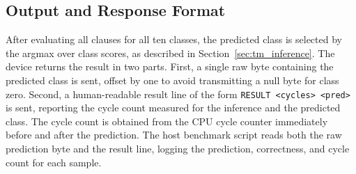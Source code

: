 \subsection{Output and Response Format}
\label{sec:output_format}

After evaluating all clauses for all ten classes, the predicted class is selected by the argmax over class scores, as described in Section~\ref{sec:tm_inference}. The device returns the result in two parts. First, a single raw byte containing the predicted class is sent, offset by one to avoid transmitting a null byte for class zero. Second, a human-readable result line of the form \texttt{RESULT <cycles> <pred>} is sent, reporting the cycle count measured for the inference and the predicted class. The cycle count is obtained from the CPU cycle counter immediately before and after the prediction. The host benchmark script reads both the raw prediction byte and the result line, logging the prediction, correctness, and cycle count for each sample.

